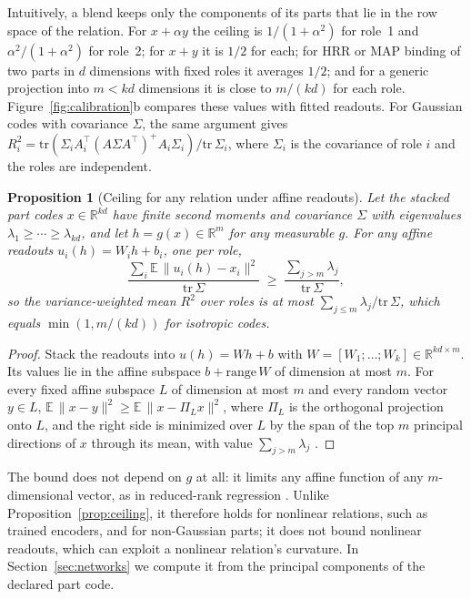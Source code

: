 \documentclass[10pt]{article}
\theoremstyle{plain}
\newtheorem{proposition}{Proposition}
\theoremstyle{remark}
\newcommand{\R}{\mathbb{R}}
\begin{document}
\noindent
Intuitively, a blend keeps only the components of its parts that lie in the row space of the relation. For $x + \alpha y$ the ceiling is $1/(1 + \alpha^2)$ for role~1 and $\alpha^2/(1 + \alpha^2)$ for role~2; for $x + y$ it is $1/2$ for each; for HRR or MAP binding of two parts in $d$ dimensions with fixed roles it averages $1/2$; and for a generic projection into $m < kd$ dimensions it is close to $m/(kd)$ for each role. Figure~\ref{fig:calibration}b compares these values with fitted readouts. For Gaussian codes with covariance $\Sigma$, the same argument gives $R^2_i = \mathrm{tr}(\Sigma_i A_i^{\top}(A\Sigma A^{\top})^{+}A_i\Sigma_i)/\mathrm{tr}\,\Sigma_i$, where $\Sigma_i$ is the covariance of role $i$ and the roles are independent.

\begin{proposition}[Ceiling for any relation under affine readouts]
\label{prop:ey}
Let the stacked part codes $x \in \R^{kd}$ have finite second moments and covariance $\Sigma$ with eigenvalues $\lambda_1 \ge \cdots \ge \lambda_{kd}$, and let $h = g(x) \in \R^m$ for any measurable $g$. For any affine readouts $u_i(h) = W_i h + b_i$, one per role,
\begin{equation}
  \frac{\sum_i \mathbb{E}\,\lVert u_i(h) - x_i \rVert^2}{\mathrm{tr}\,\Sigma} \;\ge\; \frac{\sum_{j > m} \lambda_j}{\mathrm{tr}\,\Sigma},
\end{equation}
so the variance-weighted mean $R^2$ over roles is at most $\sum_{j \le m} \lambda_j / \mathrm{tr}\,\Sigma$, which equals $\min(1, m/(kd))$ for isotropic codes.
\end{proposition}

\begin{proof}
Stack the readouts into $u(h) = Wh + b$ with $W = [W_1; \ldots; W_k] \in \R^{kd \times m}$. Its values lie in the affine subspace $b + \mathrm{range}\,W$ of dimension at most $m$. For every fixed affine subspace $L$ of dimension at most $m$ and every random vector $y \in L$, $\mathbb{E}\,\lVert x - y \rVert^2 \ge \mathbb{E}\,\lVert x - \Pi_L x \rVert^2$, where $\Pi_L$ is the orthogonal projection onto $L$, and the right side is minimized over $L$ by the span of the top $m$ principal directions of $x$ through its mean, with value $\sum_{j > m} \lambda_j$ \citep{eckart1936}.
\end{proof}

\noindent
The bound does not depend on $g$ at all: it limits any affine function of any $m$-dimensional vector, as in reduced-rank regression \citep{izenman1975}. Unlike Proposition~\ref{prop:ceiling}, it therefore holds for nonlinear relations, such as trained encoders, and for non-Gaussian parts; it does not bound nonlinear readouts, which can exploit a nonlinear relation's curvature. In Section~\ref{sec:networks} we compute it from the principal components of the declared part code.
\end{document}

